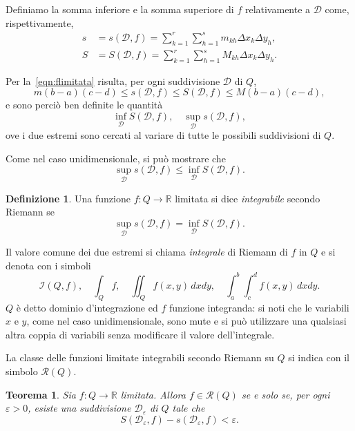 \documentclass[a4paper]{book}
\numberwithin{equation}{section}
\renewcommand{\epsilon}{\varepsilon}
\theoremstyle{plain}
\newtheorem{teor}{Teorema}[section]
\theoremstyle{definition}
\newtheorem{defn}{Definizione}[section]
\theoremstyle{remark}
\theoremstyle{example}
\begin{document}
Definiamo la somma inferiore e la somma superiore di $f$ relativamente a $\mathcal{D}$ come, rispettivamente,
	\begin{align*}
	s &= s(\mathcal{D}, f) = \sum_{k=1}^r\sum_{h=1}^s m_{kh}\Delta x_k \Delta y_h, \\
	S &= S(\mathcal{D}, f) = \sum_{k=1}^r \sum_{h=1}^s M_{kh} \Delta x_k \Delta y_h.
	\end{align*}

Per la~\eqref{eqn:flimitata} risulta, per ogni suddivisione $\mathcal{D}$ di $Q$,
	\begin{equation*}
	m(b -a )(c-d) \le s(\mathcal{D}, f) \le S(\mathcal{D}, f) \le M(b-a)(c-d),
	\end{equation*}
e sono perciò ben definite le quantità
	\begin{equation*}
	\inf_{\mathcal{D}}S(\mathcal{D}, f), \quad \sup_{\mathcal{D}}s(\mathcal{D}, f),
	\end{equation*}
ove i due estremi sono cercati al variare di tutte le possibili suddivisioni di $Q$.

Come nel caso unidimensionale, si può mostrare che
	\begin{equation*}
	\sup_{\mathcal{D}} s(\mathcal{D}, f) \le \inf_{\mathcal{D}} S(\mathcal{D}, f).
	\end{equation*}

\begin{defn}
Una funzione $f \colon Q \to \mathbb{R}$ limitata si dice \emph{integrabile} secondo Riemann se
	\begin{equation*}
	\sup_{\mathcal{D}} s(\mathcal{D}, f) = \inf_{\mathcal{D}} S(\mathcal{D}, f).
	\end{equation*}
\end{defn}

Il valore comune dei due estremi si chiama \emph{integrale} di Riemann di $f$ in $Q$ e si denota con i simboli
	\begin{equation*}
	\mathcal{I}(Q, f), \quad \int_Q f, \quad \iint_Q f(x,y)\, dxdy, \quad \int_a^b \int_c^d f(x,y) \, dxdy.
	\end{equation*}
$Q$ è detto dominio d'integrazione ed $f$ funzione integranda: si noti che le variabili $x$ e $y$, come nel caso unidimensionale, sono mute e si può utilizzare una qualsiasi altra coppia di variabili senza modificare il valore dell'integrale.

La classe delle funzioni limitate integrabili secondo Riemann su $Q$ si indica con il simbolo $\mathcal{R}(Q)$.

\begin{teor}
Sia $f \colon Q \to \mathbb{R}$ limitata. Allora $f \in \mathcal{R}(Q)$ se e solo se, per ogni $\epsilon > 0$, esiste una suddivisione $\mathcal{D}_{\epsilon}$ di $Q$ tale che
	\begin{equation}
	S(\mathcal{D}_{\epsilon}, f) - s(\mathcal{D}_{\epsilon}, f) < \epsilon.
	\end{equation}
\end{teor}
\end{document}
